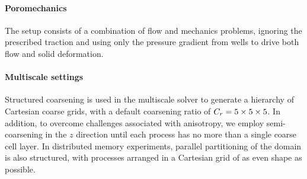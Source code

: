 \paragraph{Poromechanics}
The setup consists of a combination of flow and mechanics problems, ignoring the prescribed traction and using only the pressure gradient from wells to drive both flow and solid deformation.

\paragraph{Multiscale settings}
Structured coarsening is used in the multiscale solver to generate a hierarchy of Cartesian coarse grids, with a default coarsening ratio of $C_r = \numproduct{5x5x5}$.   In addition, to overcome challenges associated with anisotropy, we employ semi-coarsening in the $z$ direction until each process has no more than a single coarse cell layer.   In distributed memory experiments, parallel partitioning of the domain is also structured, with processes arranged in a Cartesian grid of as even shape as possible.

